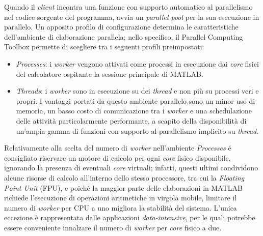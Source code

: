 Quando il \textit{client} incontra una funzione con supporto automatico al parallelismo nel codice sorgente del programma, avvia un \textit{parallel pool} per la 
sua esecuzione in parallelo. \newline
Un apposito profilo di configurazione determina le caratteristiche dell'ambiente di elaborazione parallela; nello specifico, il Parallel Computing Toolbox permette di scegliere tra i 
seguenti profili preimpostati:
\begin{itemize}
    \item \textit{Processes}: i \textit{worker} vengono attivati come processi in esecuzione dai \textit{core} fisici del calcolatore ospitante la sessione 
    principale di MATLAB.
    \item \textit{Threads}: i \textit{worker} sono in esecuzione su dei \textit{thread} e non pi\`u su processi veri e propri. I vantaggi portati da questo ambiente 
    parallelo sono un minor uso di memoria, un basso costo di comunicazione tra i \textit{worker} e una schedulazione delle attivit\`a particolarmente 
    performante, a scapito della disponibilit\`a di un'ampia gamma di funzioni con supporto al parallelismo implicito su \textit{thread}.
\end{itemize}
Relativamente alla scelta del numero di \textit{worker} nell'ambiente \textit{Processes} \'e consigliato riservare un motore di calcolo per ogni \textit{core} 
fisico disponibile, ignorando la presenza di eventuali \textit{core} virtuali; infatti, questi ultimi condividono alcune risorse di calcolo all'interno dello 
stesso processore, tra cui la \textit{Floating Point Unit} (FPU), e poich\'e la maggior parte delle elaborazioni in MATLAB richiede l'esecuzione di operazioni 
aritmetiche in virgola mobile, limitare il numero di \textit{worker} per CPU a uno migliora la stabilit\`a del sistema. \newline 
L'unica eccezione \`e rappresentata dalle applicazioni \textit{data-intensive}, per le quali potrebbe essere conveniente innalzare il numero di \textit{worker} per 
\textit{core} fisico a due.

